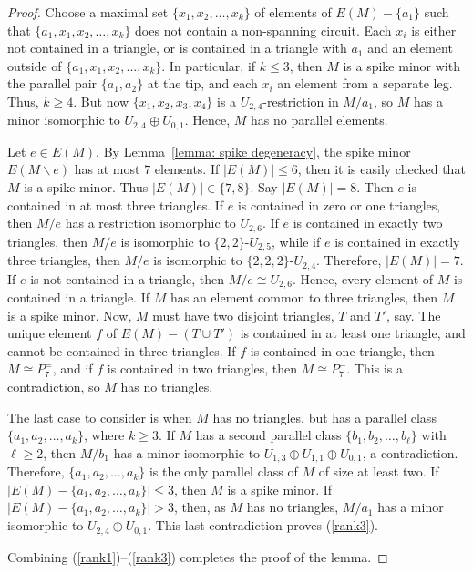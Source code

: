 \documentclass[10pt,a4paper]{amsart}
\begin{document}
\begin{proof}
Choose a maximal set $\{x_1,x_2,\ldots,x_k\}$ of elements of $E(M) - \{a_1\}$ such that $\{a_1,x_1,x_2,\ldots,x_k\}$ does not contain a non-spanning circuit. Each $x_i$ is either not contained in a triangle, or is contained in a triangle with $a_1$ and an element outside of $\{a_1,x_1,x_2,\ldots,x_k\}$. In particular, if $k \leq 3$, then $M$ is a spike minor with the parallel pair $\{a_1,a_2\}$ at the tip, and each $x_i$ an element from a separate leg. Thus, $k \geq 4$. But now $\{x_1,x_2,x_3,x_4\}$ is a $U_{2,4}$-restriction in $M / a_1$, so $M$ has a minor isomorphic to $U_{2,4} \oplus U_{0,1}$. Hence, $M$ has no parallel elements.

Let $e\in E(M)$. By Lemma~\ref{lemma: spike degeneracy}, the spike minor $E(M \backslash e)$ has at most $7$ elements. If $|E(M)|\le 6$, then it is easily checked that $M$ is a spike minor. Thus $|E(M)|\in \{7, 8\}$. Say $|E(M)| = 8$. Then $e$ is contained in at most three triangles. If $e$ is contained in zero or one triangles, then $M/e$ has a restriction isomorphic to $U_{2, 6}$. If $e$ is contained in exactly two triangles, then $M/e$ is isomorphic to $\{2, 2\}$-$U_{2, 5}$, while if $e$ is contained in exactly three triangles, then $M/e$ is isomorphic to $\{2,2,2\}$-$U_{2, 4}$. Therefore, $|E(M)| = 7$. If $e$ is not contained in a triangle, then $M/e\cong U_{2, 6}$. Hence, every element of $M$ is contained in a triangle. If $M$ has an element common to three triangles, then $M$ is a spike minor. Now, $M$ must have two disjoint triangles, $T$ and $T'$, say. The unique element $f$ of $E(M) - (T \cup T')$ is contained in at least one triangle, and cannot be contained in three triangles. If $f$ is contained in one triangle, then $M \cong P_7^=$, and if $f$ is contained in two triangles, then $M \cong P_7^-$. This is a contradiction, so $M$ has no triangles.

The last case to consider is when $M$ has no triangles, but has a parallel class $\{a_1, a_2, \ldots, a_k\}$, where $k\ge 3$. If $M$ has a second parallel class $\{b_1,b_2,\ldots,b_\ell\}$ with $\ell \geq 2$, then $M / b_1$ has a minor isomorphic to $U_{1, 3}\oplus U_{1, 1}\oplus U_{0, 1}$, a contradiction. Therefore, $\{a_1, a_2, \ldots, a_k\}$ is the only parallel class of $M$ of size at least two. If $|E(M) - \{a_1, a_2, \ldots, a_k\}|\leq 3$, then $M$ is a spike minor. If $|E(M) - \{a_1, a_2, \ldots, a_k\}| > 3$, then, as $M$ has no triangles, $M/a_1$ has a minor isomorphic to $U_{2, 4}\oplus U_{0, 1}$. This last contradiction proves (\ref{rank3}).

Combining (\ref{rank1})--(\ref{rank3}) completes the proof of the lemma.
\end{proof}
\end{document}
